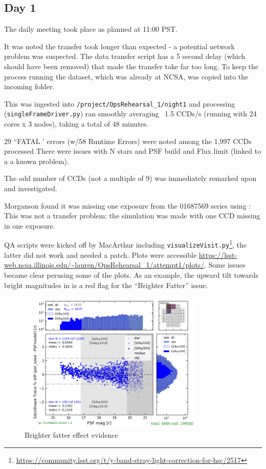 \subsection{Day 1} \label{sec:day1}

The daily meeting took place as planned at 11:00 \gls{PST}.

It was noted the transfer took longer than expected - a potential network problem was suspected.
The data transfer script has a 5 second delay (which should have been removed) that made the transfer take far too long.
To keep the process running the dataset, which was already at \gls{NCSA}, was copied into the incoming folder.

This was ingested into \texttt{/project/OpsRehearsal\_1/night1}  and processing (\texttt{singleFrameDriver.py}) ran  smoothly  averaging  ~1.5 CCDs/s  (running with 24 cores x 3 nodes), taking a total of 48 minutes.

29 ``FATAL ' errors (w/58 Runtime Errors) were noted among the 1,997 CCDs processed
There were issues with N stars and \gls{PSF} build and  Flux limit (linked to a a known problem).

The odd number of CCDs (not a multiple of 9) was immediately remarked upon and investigated.  

Morganson found it was  missing one exposure from the 01687569 series using :
This was not a transfer problem: the simulation was made with one \gls{CCD} missing in one exposure.

QA scripts were kicked off by MacArthur including \texttt{visualizeVisit.py}\footnote{\url{https://community.lsst.org/t/y-band-stray-light-correction-for-hsc/2517}}, the latter did not work and needed a \gls{patch}.
Plots were accessible \url{https://lsst-web.ncsa.illinois.edu/~lauren/OpsRehearsal_1/attempt1/plots/}.
Some issues became clear perusing some of the plots.  As an example, the upward tilt towards bright magnitudes in  is a red flag for the ``Brighter Fatter'' issue.


\begin{figure}
\includegraphics[width=0.8\textwidth]{plots/plot-v199540-psfTraceDiff-psfMagHist}
\caption{Brighter fatter effect evidence }
\label{fig:bfp}
\end{figure}

